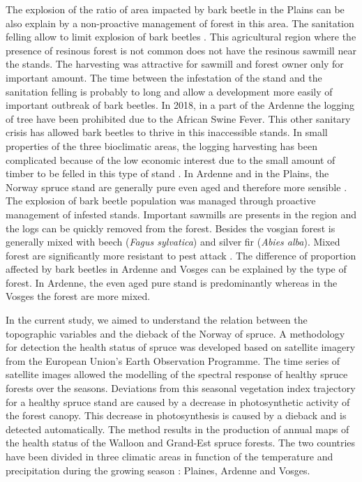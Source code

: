 \documentclass[3p,procedia]{elsarticle}
\begin{document}
The explosion of the ratio of area impacted by bark beetle in the Plains can be also explain by a non-proactive management of forest in this area.
The sanitation felling allow to limit explosion of bark beetles \citep{stadelmann_effects_2013}.
This agricultural region where the presence of resinous forest is not common does not have the resinous sawmill near the stands.
The harvesting was attractive for sawmill and forest owner only for important amount.  
The time between the infestation of the stand and the sanitation felling is probably to long and allow a development more easily of important outbreak of bark beetles.
In 2018, in a part of the Ardenne the logging of tree have been prohibited due to the African Swine Fever. 
This other sanitary crisis has allowed bark beetles to thrive in this inaccessible stands.
In small properties of the three bioclimatic areas, the logging harvesting has been complicated because of the low economic interest due to the small amount of timber to be felled in this type of stand \citep{senecal_crise_2020}.
In Ardenne and in the Plains, the Norway spruce stand are generally pure even aged and therefore more sensible \citep{jactel_2021}.
The explosion of bark beetle population was managed through proactive management of infested stands.
Important sawmills are presents in the region and the logs can be quickly removed from the forest.
Besides the vosgian forest is generally mixed with beech (\textit{Fagus sylvatica}) and  silver fir (\textit{Abies alba}).
Mixed forest are significantly more resistant to pest attack \citep{faccoli_composition_2014,jactel_2021}. 
The difference of proportion affected by bark beetles in Ardenne and Vosges can be explained by the type of forest.
In Ardenne, the even aged pure stand is predominantly whereas in the Vosges  the forest are more mixed. 





\iffalse
In the current study, we aimed to understand the relation between the topographic variables and the dieback of the Norway of spruce.
A methodology for detection the health status of spruce was developed based on satellite imagery from the European Union's Earth Observation Programme. The time series of satellite images allowed the modelling of the spectral response of healthy spruce forests over the seasons. 
Deviations from this seasonal vegetation index trajectory for a healthy spruce stand are caused by a decrease in photosynthetic activity of the forest canopy.
This decrease in photosynthesis is caused by a dieback and is detected automatically.
The method results in the production of annual maps of the health status of the Walloon and Grand-Est spruce forests.
The two countries have been divided in three climatic areas in function of the temperature and precipitation during the growing season : Plaines, Ardenne and Vosges.
\end{document}
